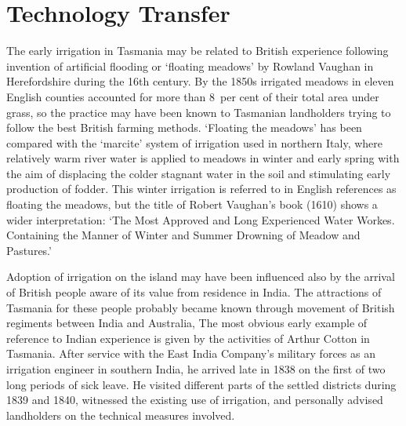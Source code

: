 \section*{Technology Transfer}

The early irrigation in Tasmania may be related to
British experience following invention of artificial
flooding or `floating meadows' by Rowland
Vaughan  in Herefordshire during the 16th century.
By the 1850s irrigated meadows in eleven English counties accounted
for more than 8~per cent of their total area under grass, so the
practice may have been known to Tasmanian landholders trying to follow
the best British farming methods.  `Floating the meadows' has been
compared with the `marcite' system of irrigation used in northern
Italy, where relatively warm river water is applied to
meadows in winter and early spring with the aim of displacing the
colder stagnant water in the soil and stimulating early production of
fodder.  This winter irrigation is referred to in
English references as floating the meadows, but the title of Robert
Vaughan's book (1610) shows a wider interpretation: `The Most Approved
and Long Experienced Water Workes.  Containing the Manner of Winter
and Summer Drowning of Meadow and
Pastures.'

Adoption of irrigation on the island may have been influenced also by
the arrival of British people aware of its value from residence in
India.  The attractions of Tasmania for these people probably became
known through movement of British regiments between India
and Australia, The most obvious early example of reference to Indian
experience is given by the activities of Arthur Cotton in Tasmania.  After service with the East India Company's military
forces as an irrigation engineer in southern India, he arrived late in
1838 on the first of two long periods of sick leave.  He visited
different parts of the settled districts during 1839 and 1840,
witnessed the existing use of irrigation, and personally advised
landholders on the technical measures
involved.

